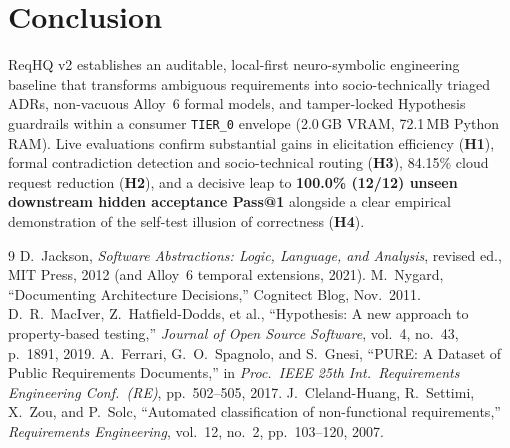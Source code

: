 \documentclass[11pt,a4paper]{article}
\begin{document}
\section{Conclusion}
ReqHQ v2 establishes an auditable, local-first neuro-symbolic engineering baseline that transforms ambiguous requirements into socio-technically triaged ADRs, non-vacuous Alloy~6 formal models, and tamper-locked Hypothesis guardrails within a consumer \texttt{TIER\_0} envelope (2.0\,GB VRAM, 72.1\,MB Python RAM). Live evaluations confirm substantial gains in elicitation efficiency (\textbf{H1}), formal contradiction detection and socio-technical routing (\textbf{H3}), 84.15\% cloud request reduction (\textbf{H2}), and a decisive leap to \textbf{100.0\% (12/12) unseen downstream hidden acceptance Pass@1} alongside a clear empirical demonstration of the self-test illusion of correctness (\textbf{H4}).

\begin{thebibliography}{9}
D.~Jackson, \emph{Software Abstractions: Logic, Language, and Analysis}, revised ed., MIT Press, 2012 (and Alloy~6 temporal extensions, 2021).
M.~Nygard, ``Documenting Architecture Decisions,'' Cognitect Blog, Nov.\ 2011.
D.~R.~MacIver, Z.~Hatfield-Dodds, et al., ``Hypothesis: A new approach to property-based testing,'' \emph{Journal of Open Source Software}, vol.~4, no.~43, p.~1891, 2019.
A.~Ferrari, G.~O.~Spagnolo, and S.~Gnesi, ``PURE: A Dataset of Public Requirements Documents,'' in \emph{Proc.\ IEEE 25th Int.\ Requirements Engineering Conf.\ (RE)}, pp.~502--505, 2017.
J.~Cleland-Huang, R.~Settimi, X.~Zou, and P.~Solc, ``Automated classification of non-functional requirements,'' \emph{Requirements Engineering}, vol.~12, no.~2, pp.~103--120, 2007.
\end{thebibliography}
\end{document}
